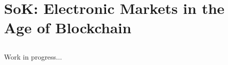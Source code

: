 \chapter{SoK: Electronic Markets in the Age of Blockchain}
\label{chapter2}

\section{}

Work in progress...
